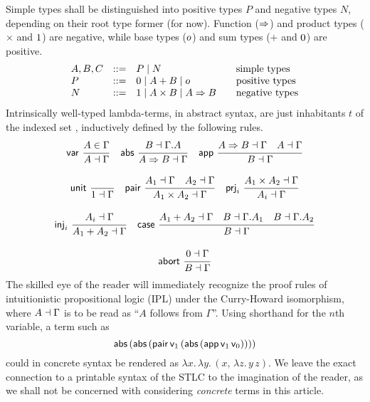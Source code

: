 \documentclass[sigconf,screen,fleqn]{acmart} %
\begin{document}
Simple types shall be distinguished into positive types $P$ and
negative types $N$, depending on their root type former (for now).  Function
($\Rightarrow$) and product types ($\times$ and $1$) are negative,
while base types ($o$) and sum types ($+$ and $0$) are positive.
\[
\begin{array}{lrl@{\qquad}l}
  A,B,C & ::= & P \mid N & \mbox{simple types} \\
  P     & ::= & \tyzero \mid A + B \mid \tybase & \mbox{positive types} \\
  N     & ::= & \tyone \mid A \times B \mid A \To B
    & \mbox{negative types} \\
\end{array}
\]
Intrinsically well-typed lambda-terms, in abstract syntax,
are just inhabitants $t$ of the indexed set ,
inductively defined by the following rules.
\begin{gather*}
  \nru{\tvar}{A \in \Gamma}{A \from \Gamma}
\quad
  \nru{\tabs}{B \from \cext \Gamma A}{A \To B \from \Gamma}
\quad
  \nru{\tapp}
    {A \To B \from \Gamma \quad A \from \Gamma}
    {B \from \Gamma}
\\[2ex]
  \nru{\tunit}{}{\tyone \from \Gamma}
\quad
  \nru{\tpair}
    {A_1 \from \Gamma \quad A_2 \from \Gamma}
    {A_1 \times A_2 \from \Gamma}
\quad
  \nru{\tprj_i}
    {A_1 \times A_2 \from \Gamma}
    {A_i \from \Gamma}
\\[2ex]
  \nru{\tinj_i}
    {A_i \from \Gamma}
    {A_1 + A_2 \from \Gamma}
\quad
  \nru{\tcase}
    {A_1 + A_2 \from \Gamma
      \quad B \from \cext \Gamma A_1
      \quad B \from \cext \Gamma A_2
    }{B \from \Gamma}
\\[2ex]
  \nru{\tabort}
    {\tyzero \from \Gamma}
    {B \from \Gamma}
\end{gather*}
The skilled eye of the reader will immediately recognize the proof
rules of intuitionistic propositional logic (IPL) under the
Curry-Howard isomorphism, where $A \dashv \Gamma$ is to be read as
``$A$ follows from $\Gamma$''.  Using shorthand
 for the $n$th variable,
a term such as
\[
  \mathsf{abs}\,(\mathsf{abs}\,(\mathsf{pair}\,
    \mathsf{v}_{1}\,
    (\mathsf{abs}\,(\mathsf{app}\,\mathsf{v}_{1}\,\mathsf{v}_{0}))))
\]
could in concrete syntax be rendered as
\(
  \lambda x.\,\lambda y.\,(x,\,\lambda z.\,y\,z)
  .
\)
We leave the exact connection to a printable
syntax of the STLC to the imagination of the reader,
as we shall not be concerned with considering
\emph{concrete} terms in this article.
\end{document}
